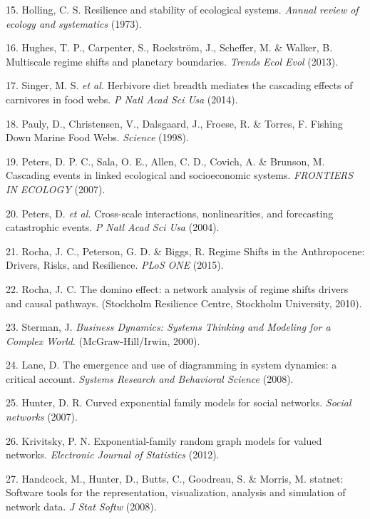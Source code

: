 \documentclass[9pt,]{article}
\begin{document}
\hypertarget{ref-Holling:1973p6861}{}
15. Holling, C. S. Resilience and stability of ecological systems.
\emph{Annual review of ecology and systematics} (1973).

\hypertarget{ref-Hughes:2013cv}{}
16. Hughes, T. P., Carpenter, S., Rockström, J., Scheffer, M. \& Walker,
B. Multiscale regime shifts and planetary boundaries. \emph{Trends Ecol
Evol} (2013).

\hypertarget{ref-Singer:2014gj}{}
17. Singer, M. S. \emph{et al.} Herbivore diet breadth mediates the
cascading effects of carnivores in food webs. \emph{P Natl Acad Sci Usa}
(2014).

\hypertarget{ref-Pauly:1998iw}{}
18. Pauly, D., Christensen, V., Dalsgaard, J., Froese, R. \& Torres, F.
Fishing Down Marine Food Webs. \emph{Science} (1998).

\hypertarget{ref-Anonymous:2007tc}{}
19. Peters, D. P. C., Sala, O. E., Allen, C. D., Covich, A. \& Brunson,
M. Cascading events in linked ecological and socioeconomic systems.
\emph{FRONTIERS IN ECOLOGY} (2007).

\hypertarget{ref-DebraPCPeters:2004ex}{}
20. Peters, D. \emph{et al.} Cross-scale interactions, nonlinearities,
and forecasting catastrophic events. \emph{P Natl Acad Sci Usa} (2004).

\hypertarget{ref-Rocha:2015du}{}
21. Rocha, J. C., Peterson, G. D. \& Biggs, R. Regime Shifts in the
Anthropocene: Drivers, Risks, and Resilience. \emph{PLoS ONE} (2015).

\hypertarget{ref-Rocha:2010vv}{}
22. Rocha, J. C. The domino effect: a network analysis of regime shifts
drivers and causal pathways. (Stockholm Resilience Centre, Stockholm
University, 2010).

\hypertarget{ref-Sterman:2000we}{}
23. Sterman, J. \emph{Business Dynamics: Systems Thinking and Modeling
for a Complex World}. (McGraw-Hill/Irwin, 2000).

\hypertarget{ref-Lane:2008p6781}{}
24. Lane, D. The emergence and use of diagramming in system dynamics: a
critical account. \emph{Systems Research and Behavioral Science} (2008).

\hypertarget{ref-Hunter:2007bq}{}
25. Hunter, D. R. Curved exponential family models for social networks.
\emph{Social networks} (2007).

\hypertarget{ref-Krivitsky:2012uo}{}
26. Krivitsky, P. N. Exponential-family random graph models for valued
networks. \emph{Electronic Journal of Statistics} (2012).

\hypertarget{ref-Handcock:2008p5095}{}
27. Handcock, M., Hunter, D., Butts, C., Goodreau, S. \& Morris, M.
statnet: Software tools for the representation, visualization, analysis
and simulation of network data. \emph{J Stat Softw} (2008).
\end{document}
